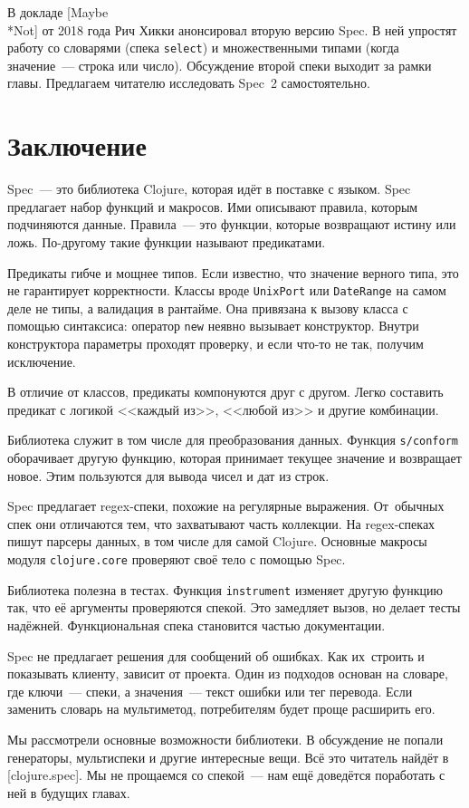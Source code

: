 
В докладе [Maybe\\*Not]
от 2018 года Рич Хикки анонсировал вторую версию Spec. В ней упростят работу со
словарями (спека \verb|select|) и множественными типами (когда значение~---
строка или число). Обсуждение второй спеки выходит за рамки главы. Предлагаем
читателю исследовать Spec~2 самостоятельно.

\section{Заключение}

Spec~--- это библиотека Clojure, которая идёт в поставке с языком. Spec
предлагает набор функций и макросов. Ими описывают правила, которым подчиняются
данные. Правила~--- это функции, которые возвращают истину или ложь. По-другому
такие функции называют предикатами.

Предикаты гибче и мощнее типов. Если известно, что значение верного типа, это не
гарантирует корректности. Классы вроде \verb|UnixPort| или \verb|DateRange| на
самом деле не типы, а валидация в рантайме. Она привязана к вызову класса с
помощью синтаксиса: оператор \verb|new| неявно вызывает конструктор. Внутри
конструктора параметры проходят проверку, и если что-то не так, получим
исключение.

В отличие от классов, предикаты компонуются друг с другом. Легко составить
предикат с логикой <<каждый из>>, <<любой из>> и другие комбинации.

Библиотека служит в том числе для преобразования данных. Функция
\verb|s/conform| оборачивает другую функцию, которая принимает текущее значение
и возвращает новое. Этим пользуются для вывода чисел и дат из строк.

Spec предлагает regex-спеки, похожие на регулярные выражения. От~обычных спек
они отличаются тем, что захватывают часть коллекции. На regex-спеках пишут
парсеры данных, в том числе для самой Clojure. Основные макросы модуля
\verb|clojure.core| проверяют своё тело с помощью Spec.

Библиотека полезна в тестах. Функция \verb|instrument| изменяет другую функцию
так, что её аргументы проверяются спекой. Это замедляет вызов, но делает тесты
надёжней. Функциональная спека становится частью документации.

Spec не предлагает решения для сообщений об ошибках. Как их~строить и показывать
клиенту, зависит от проекта. Один из подходов основан на словаре, где ключи~---
спеки, а значения~--- текст ошибки или тег перевода. Если заменить словарь на
мультиметод, потребителям будет проще расширить его.

Мы рассмотрели основные возможности библиотеки. В обсуждение не попали
генераторы, мультиспеки и другие интересные вещи. Всё это читатель найдёт в
[clojure.spec].
Мы не прощаемся со спекой~--- нам ещё доведётся поработать с ней в будущих главах.
